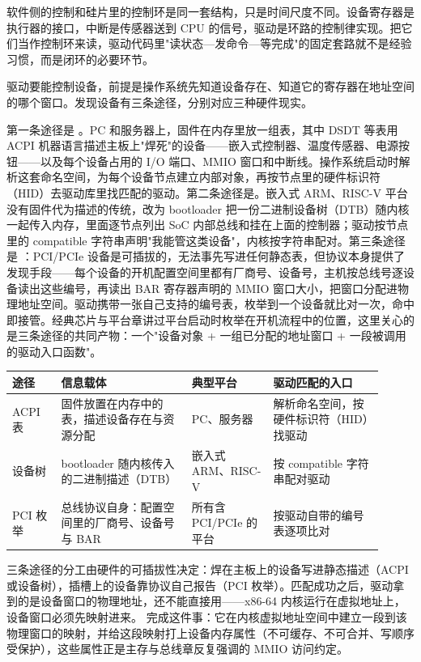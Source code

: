 \begin{keyidea}
软件侧的控制和硅片里的控制环是同一套结构，只是时间尺度不同。设备寄存器是执行器的接口，中断是传感器送到 CPU 的信号，驱动是环路的控制律实现。把它们当作控制环来读，驱动代码里"读状态—发命令—等完成"的固定套路就不是经验习惯，而是闭环的必要环节。
\end{keyidea}


驱动要能控制设备，前提是操作系统先知道设备存在、知道它的寄存器在地址空间的哪个窗口。发现设备有三条途径，分别对应三种硬件现实。

第一条途径是 。PC 和服务器上，固件在内存里放一组表，其中 DSDT 等表用 ACPI 机器语言描述主板上"焊死"的设备——嵌入式控制器、温度传感器、电源按钮——以及每个设备占用的 I/O 端口、MMIO 窗口和中断线。操作系统启动时解析这套命名空间，为每个设备节点建立内部对象，再按节点里的硬件标识符（HID）去驱动库里找匹配的驱动。第二条途径是。嵌入式 ARM、RISC-V 平台没有固件代为描述的传统，改为 bootloader 把一份二进制设备树（DTB）随内核一起传入内存，里面逐节点列出 SoC 内部总线和挂在上面的控制器；驱动按节点里的 compatible 字符串声明"我能管这类设备"，内核按字符串配对。第三条途径是 ：PCI/PCIe 设备是可插拔的，无法事先写进任何静态表，但协议本身提供了发现手段——每个设备的开机配置空间里都有厂商号、设备号，主机按总线号逐设备读出这些编号，再读出 BAR 寄存器声明的 MMIO 窗口大小，把窗口分配进物理地址空间。驱动携带一张自己支持的编号表，枚举到一个设备就比对一次，命中即接管。经典芯片与平台章讲过平台启动时枚举在开机流程中的位置，这里关心的是三条途径的共同产物：一个"设备对象 + 一组已分配的地址窗口 + 一段被调用的驱动入口函数"。

\begin{longtable}{L{0.12\linewidth}L{0.32\linewidth}L{0.20\linewidth}L{0.27\linewidth}}
\toprule
途径 & 信息载体 & 典型平台 & 驱动匹配的入口 \\
\midrule
ACPI 表 & 固件放置在内存中的表，描述设备存在与资源分配 & PC、服务器 & 解析命名空间，按硬件标识符（HID）找驱动 \\
设备树 & bootloader 随内核传入的二进制描述（DTB） & 嵌入式 ARM、RISC-V & 按 compatible 字符串配对驱动 \\
PCI 枚举 & 总线协议自身：配置空间里的厂商号、设备号与 BAR & 所有含 PCI/PCIe 的平台 & 按驱动自带的编号表逐项比对 \\
\bottomrule
\end{longtable}

三条途径的分工由硬件的可插拔性决定：焊在主板上的设备写进静态描述（ACPI 或设备树），插槽上的设备靠协议自己报告（PCI 枚举）。匹配成功之后，驱动拿到的是设备窗口的物理地址，还不能直接用——x86-64 内核运行在虚拟地址上，设备窗口必须先映射进来。 完成这件事：它在内核虚拟地址空间中建立一段到该物理窗口的映射，并给这段映射打上设备内存属性（不可缓存、不可合并、写顺序受保护），这些属性正是主存与总线章反复强调的 MMIO 访问约定。

